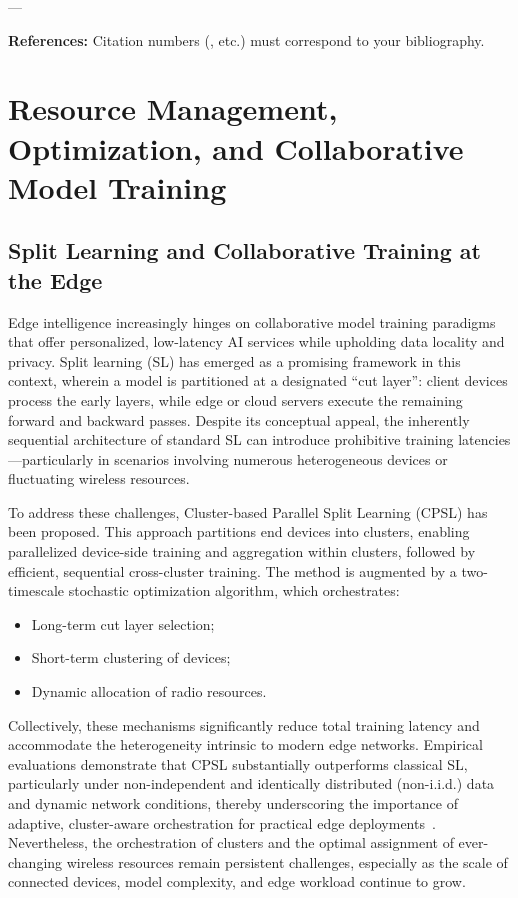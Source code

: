 \documentclass[11pt]{article}
\begin{document}
---

\noindent \textbf{References:} Citation numbers (\cite{ref10}, etc.) must correspond to your bibliography.

\section{Resource Management, Optimization, and Collaborative Model Training}
\label{sec:resource_management}

\subsection{Split Learning and Collaborative Training at the Edge}

Edge intelligence increasingly hinges on collaborative model training paradigms that offer personalized, low-latency AI services while upholding data locality and privacy. Split learning (SL) has emerged as a promising framework in this context, wherein a model is partitioned at a designated ``cut layer'': client devices process the early layers, while edge or cloud servers execute the remaining forward and backward passes. Despite its conceptual appeal, the inherently sequential architecture of standard SL can introduce prohibitive training latencies—particularly in scenarios involving numerous heterogeneous devices or fluctuating wireless resources.

To address these challenges, Cluster-based Parallel Split Learning (CPSL) has been proposed. This approach partitions end devices into clusters, enabling parallelized device-side training and aggregation within clusters, followed by efficient, sequential cross-cluster training. The method is augmented by a two-timescale stochastic optimization algorithm, which orchestrates:

\begin{itemize}
    \item Long-term cut layer selection;
    \item Short-term clustering of devices;
    \item Dynamic allocation of radio resources.
\end{itemize}

Collectively, these mechanisms significantly reduce total training latency and accommodate the heterogeneity intrinsic to modern edge networks. Empirical evaluations demonstrate that CPSL substantially outperforms classical SL, particularly under non-independent and identically distributed (non-i.i.d.) data and dynamic network conditions, thereby underscoring the importance of adaptive, cluster-aware orchestration for practical edge deployments~\cite{ref47}. Nevertheless, the orchestration of clusters and the optimal assignment of ever-changing wireless resources remain persistent challenges, especially as the scale of connected devices, model complexity, and edge workload continue to grow.
\end{document}
